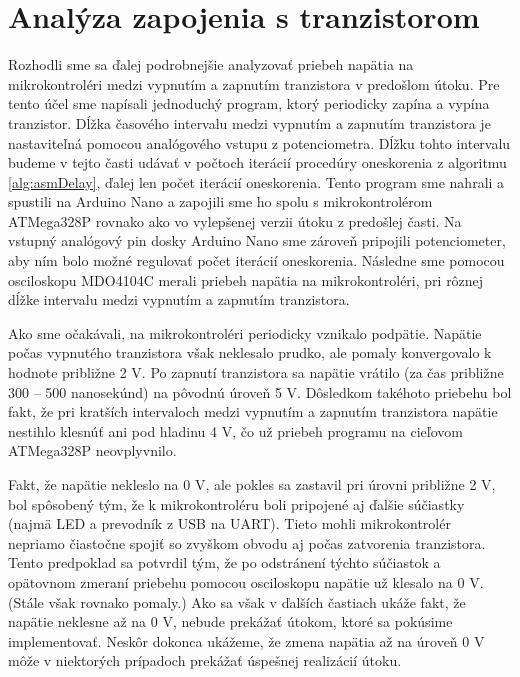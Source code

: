 \section{Analýza zapojenia s tranzistorom} \label{kap3:sek:analyZaTranzistoru}
Rozhodli sme sa ďalej podrobnejšie analyzovať priebeh napätia na mikrokontroléri medzi vypnutím a zapnutím tranzistora v predošlom útoku. Pre tento účel sme napísali jednoduchý program, ktorý periodicky zapína a vypína tranzistor. Dĺžka časového intervalu medzi vypnutím a zapnutím tranzistora je nastaviteľná pomocou analógového vstupu z potenciometra. Dĺžku tohto intervalu budeme v tejto časti udávať v počtoch iterácií procedúry oneskorenia z algoritmu \ref{alg:asmDelay}, ďalej len počet iterácií oneskorenia. Tento program sme nahrali a spustili na Arduino Nano a zapojili sme ho spolu s mikrokontrolérom ATMega328P rovnako ako vo vylepšenej verzii útoku z predošlej časti. Na vstupný analógový pin dosky Arduino Nano sme zároveň pripojili potenciometer, aby ním bolo možné regulovať počet iterácií oneskorenia. Následne sme pomocou osciloskopu MDO4104C merali priebeh napätia na mikrokontroléri, pri rôznej dĺžke intervalu medzi vypnutím a zapnutím tranzistora.

Ako sme očakávali, na mikrokontroléri periodicky vznikalo podpätie. Napätie počas vypnutého tranzistora však neklesalo prudko, ale pomaly konvergovalo k hodnote približne 2 V. Po zapnutí tranzistora sa napätie vrátilo (za čas približne 300 -- 500 nanosekúnd) na pôvodnú úroveň 5 V. Dôsledkom takéhoto priebehu bol fakt, že pri kratších intervaloch medzi vypnutím a zapnutím tranzistora napätie nestihlo klesnúť ani pod hladinu 4 V, čo už priebeh programu na cieľovom ATMega328P neovplyvnilo.

Fakt, že napätie nekleslo na 0 V, ale pokles sa zastavil pri úrovni približne 2 V, bol spôsobený tým, že k mikrokontroléru boli pripojené aj ďalšie súčiastky (najmä LED a prevodník z USB na UART). Tieto mohli mikrokontrolér nepriamo čiastočne spojiť so zvyškom obvodu aj počas zatvorenia tranzistora. Tento predpoklad sa potvrdil tým, že po odstránení týchto súčiastok a opätovnom zmeraní priebehu pomocou osciloskopu napätie už klesalo na 0 V. (Stále však rovnako pomaly.) Ako sa však v ďalších častiach ukáže fakt, že napätie neklesne až na 0 V, nebude prekážať útokom, ktoré sa pokúsime implementovať. Neskôr dokonca ukážeme, že zmena napätia až na úroveň 0 V môže v niektorých prípadoch prekážať úspešnej realizácií útoku.

